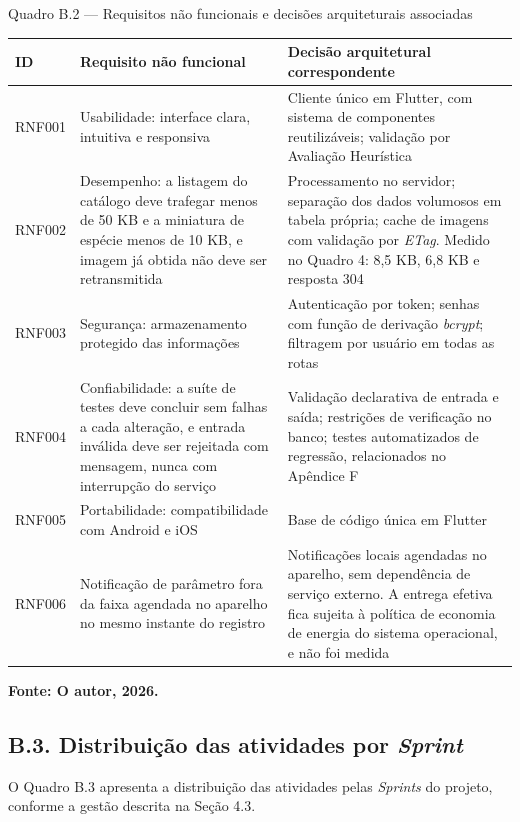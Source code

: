 \documentclass[12pt,oneside,a4paper,brazilian]{abntex2}
\newcommand{\legendaabnt}[1]{%
  \par\vspace{9pt}%
  \begingroup\centering\normalsize\SingleSpacing #1\par\endgroup
  \vspace{3pt}}
\newcommand{\fonteabnt}[1]{%
  \par\vspace{3pt}%
  \begingroup\centering\normalsize\SingleSpacing\bfseries #1\par\endgroup
  \vspace{9pt}}
\begin{document}
\legendaabnt{Quadro B.2 --- Requisitos não funcionais e decisões arquiteturais associadas}
{\footnotesize\SingleSpacing
\setlength{\LTpre}{0pt}\setlength{\LTpost}{0pt}
\setlength{\extrarowheight}{3pt}
\begin{longtable}{|>{\raggedright\arraybackslash}p{1.2cm}|>{\raggedright\arraybackslash}p{5.6cm}|>{\raggedright\arraybackslash}p{7.3cm}|}
\hline
\textbf{ID} & \textbf{Requisito não funcional} & \textbf{Decisão arquitetural correspondente} \\[2pt] \hline \endhead
RNF001 & Usabilidade: interface clara, intuitiva e responsiva & Cliente único em Flutter, com sistema de componentes reutilizáveis; validação por Avaliação Heurística \\[2pt] \hline
RNF002 & Desempenho: a listagem do catálogo deve trafegar menos de 50 KB e a miniatura de espécie menos de 10 KB, e imagem já obtida não deve ser retransmitida & Processamento no servidor; separação dos dados volumosos em tabela própria; cache de imagens com validação por \textit{ETag}. Medido no Quadro 4: 8,5 KB, 6,8 KB e resposta 304 \\[2pt] \hline
RNF003 & Segurança: armazenamento protegido das informações & Autenticação por token; senhas com função de derivação \textit{bcrypt}; filtragem por usuário em todas as rotas \\[2pt] \hline
RNF004 & Confiabilidade: a suíte de testes deve concluir sem falhas a cada alteração, e entrada inválida deve ser rejeitada com mensagem, nunca com interrupção do serviço & Validação declarativa de entrada e saída; restrições de verificação no banco; testes automatizados de regressão, relacionados no Apêndice F \\[2pt] \hline
RNF005 & Portabilidade: compatibilidade com Android e iOS & Base de código única em Flutter \\[2pt] \hline
RNF006 & Notificação de parâmetro fora da faixa agendada no aparelho no mesmo instante do registro & Notificações locais agendadas no aparelho, sem dependência de serviço externo. A entrega efetiva fica sujeita à política de economia de energia do sistema operacional, e não foi medida \\[2pt] \hline
\end{longtable}}
\fonteabnt{Fonte: O autor, 2026.}

\subsection*{B.3. Distribuição das atividades por \textit{Sprint}}
O Quadro B.3 apresenta a distribuição das atividades pelas \textit{Sprints} do projeto, conforme a gestão descrita na Seção 4.3.
\end{document}
